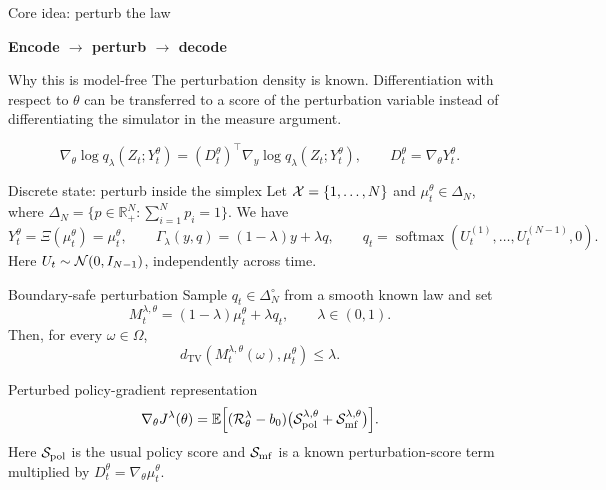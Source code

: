\documentclass[9pt]{beamer}
\def\Xc{{\cal X}}
\def\Rc{{\cal R}}
\def\Sc{{\cal S}}
\def\Nc{{\cal N}}
\def\E{{\mathbb E}}
\def\R{{\mathbb R}}
\newcommand{\TV}{d_{\mathrm{TV}}}
\newcommand{\exhibittitle}[1]{%
  \begin{center}{\small\bfseries\color{Xblue}#1}\end{center}%
  \vspace{-0.28cm}}
\newenvironment{exhibit}[1]{%
  \exhibittitle{#1}%
  \par\vspace{0.05cm}\begin{center}}%
  {\end{center}\vspace{-0.15cm}}
\begin{document}
\begin{frame}{Core idea: perturb the law}
\begin{exhibit}{Encode $\longrightarrow$ perturb $\longrightarrow$ decode}
\end{exhibit}
\vspace{0.5cm}
\begin{block}{Why this is model-free}
The perturbation density is known. Differentiation with respect to $\theta$ can be transferred to a score of the perturbation variable instead of differentiating the simulator in the measure argument.
\end{block}
\[
  \nabla_\theta\log q_\lambda(Z_t;Y_t^\theta)
  = (D_t^\theta)^\top \nabla_y \log q_\lambda(Z_t;Y_t^\theta),
  \qquad D_t^\theta=\nabla_\theta Y_t^\theta.
\]
\end{frame}

\begin{frame}{Discrete state: perturb inside the simplex}
Let $\Xc=\{1,\ldots,N\}$ and $\mu_t^\theta\in\Delta_N$, where $\Delta_N = \{p\in\R^N_+: \sum_{i=1}^N p_i=1\}$. We have
\[
  Y_t^\theta=\Xi(\mu_t^\theta)=\mu_t^\theta,\qquad
  \Gamma_\lambda(y,q)=(1-\lambda)y+\lambda q,\qquad
  q_t=\operatorname{softmax}(U_t^{(1)},\ldots,U_t^{(N-1)},0).
\]
Here $U_t\sim\Nc(0,I_{N-1})$, independently across time.

\begin{block}{Boundary-safe perturbation}
Sample $q_t\in\Delta_N^\circ$ from a smooth known law and set
\[
  M_t^{\lambda,\theta}=(1-\lambda)\mu_t^\theta+\lambda q_t,
  \qquad \lambda\in(0,1).
\]
Then, for every $\omega\in\Omega$,
\[
  \TV(M_t^{\lambda,\theta}(\omega),\mu_t^\theta)\leq \lambda.
\]
\end{block}

\begin{block}{Perturbed policy-gradient representation}
\[
  \nabla_\theta J^\lambda(\theta)
  =\E\Big[(\Rc_\theta^\lambda-b_0)
  \big(\Sc_{\mathrm{pol}}^{\lambda,\theta}+\Sc_{\mathrm{mf}}^{\lambda,\theta}\big)\Big].
\]
Here $\Sc_{\mathrm{pol}}$ is the usual policy score and $\Sc_{\mathrm{mf}}$ is a known perturbation-score term multiplied by $D_t^\theta=\nabla_\theta\mu_t^\theta$.
\end{block}
\end{frame}
\end{document}
